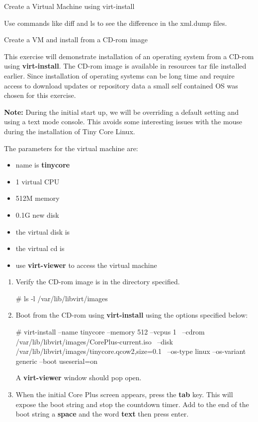 \begin{Lab}
\begin{exe}  {Create a Virtual Machine using virt-install}
\begin{sol}
\begin{enumerate}
			Use commands like diff and ls to see the difference in the xml.dump files. 

		\end{enumerate}

	\end{sol}

\end{exe} 

\begin{exe} {Create a VM and install from a CD-rom image} 

	This exercise will demonstrate installation of an operating system from a CD-rom 
	using \textbf{virt-install}. 
	The CD-rom image is available in resources tar file installed earlier. Since 
	installation of operating systems can be long time and require access to 
	download updates or repository data a small self contained OS was chosen for 
	this exercise. 

	\textbf{Note:} During the initial start up, we will be overriding a default setting 
	and using a text mode console. This avoids some interesting issues with the mouse 
	during the installation of Tiny Core Linux. 

 The parameters for the virtual machine are:
        \begin{itemize}
                \item name is \textbf{tinycore}
                \item 1 virtual CPU
                \item 512M memory
		\item 0.1G new disk 
                \item the virtual disk is 
                \item the virtual cd is 
                \item use \textbf{virt-viewer} to access the virtual machine
	\end{itemize}

	\begin{enumerate}
	\item Verify the CD-rom image is in the directory specified.
		\begin{raw}
# ls -l /var/lib/libvirt/images 
		\end{raw}
	\item Boot from the CD-rom using \textbf{virt-install} using the options specified below:
		\begin{raw}
# virt-install  --name tinycore --memory 512 --vcpus 1 \
		--cdrom /var/lib/libvirt/images/CorePlus-current.iso \
		--disk /var/lib/libvirt/images/tinycore.qcow2,size=0.1 \
		--os-type linux --os-variant generic --boot useserial=on 
		\end{raw}
			A \textbf{virt-viewer} window should pop open. 
		\item When the initial Core Plus screen appears, press the \textbf{tab} key. This 
			will expose the boot string and stop the countdown timer. 
			Add to the end of the boot string a \textbf{space} 
			and the word \textbf{text} then	press enter.


\end{enumerate}
\end{exe}
\end{Lab}
